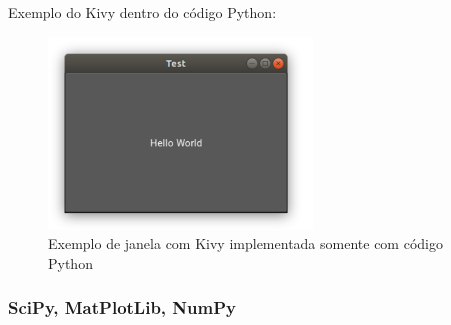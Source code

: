             Exemplo do Kivy dentro do código Python:
            \begin{quote}
                                                                                 
            \end{quote}
            
            \begin{figure}[H]
                \caption{Exemplo de janela com Kivy implementada somente com código Python}
                \begin{center}
                    \includegraphics[width=7cm]{texto/fig/hello_world_kivy.png} 
                \end{center}
                \label{janela_kivy} 
            \end{figure}


            
            \subsubsection{SciPy, MatPlotLib, NumPy}
            \label{lim_scipy}
            
